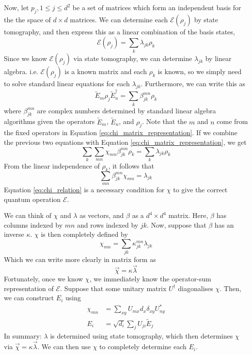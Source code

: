 Now, let $p_j, 1 \le j \le d^2$ be a set of matrices which form an independent basis for the the
space of $d \times d$ matrices. We can determine each $\mathcal{E}(\rho_j)$ by state tomography, and
then express this as a linear combination of the basis states,
\begin{equation}
    \mathcal{E}(\rho_j) = \sum_k \lambda_{jk} \rho_k
\end{equation}
Since we know $\mathcal{E}(\rho_j)$ via state tomography, we can determine $\lambda_{jk}$ by linear
algebra. i.e. $\mathcal{E}(\rho_j)$ is a known matrix and each $\rho_k$ is known, so we simply need
to solve standard linear equations for each $\lambda_{jk}$. Furthermore, we can write this as
\begin{equation}
    \tilde{E}_m \rho_j \tilde{E}_n^{\dagger} = \sum_k \beta_{jk}^{mn} \rho_k
\end{equation}
where $\beta_{jk}^{mn}$ are complex numbers determined by standard linear algebra algorithms given
the operators $\tilde{E}_m$, $\tilde{E}_n$, and $\rho_j$. Note that the $m$ and $n$ come from the
fixed operators in Equation \ref{eq:chi_matrix_representation}. If we combine the previous two
equations with Equation \ref{eq:chi_matrix_representation}, we get
\begin{equation}
    \sum_k \sum_{mn} \chi_{mn} \beta_{jk}^{mn} \rho_k = \sum_k \lambda_{jk} \rho_k
\end{equation}
From the linear independence of $\rho_k$, it follows that
\begin{equation} \label{eq:chi_relation}
    \sum_{mn} \beta_{jk}^{mn} \chi_{mn} = \lambda_{jk}
\end{equation}
Equation \ref{eq:chi_relation} is a necessary condition for $\chi$ to give the correct quantum
operation $\mathcal{E}$.

We can think of $\chi$ and $\lambda$ as vectors, and $\beta$ as a $d^4 \times d^4$ matrix. Here,
$\beta$ has columns indexed by $mn$ and rows indexed by $jk$. Now, suppose that $\beta$ has an
inverse $\kappa$. $\chi$ is then completely defined by
\begin{equation}
    \chi_{mn} = \sum_{jk} \kappa_{jk}^{mn} \lambda_{jk}
\end{equation}
Which we can write more clearly in matrix form as
\begin{equation}
    \vec{\chi} = \kappa \vec{\lambda}
\end{equation}
Fortunately, once we know $\chi$, we immediately know the operator-sum representation of
$\mathcal{E}$. Suppose that some unitary matrix $U^{\dagger}$ diagonalises $\chi$. Then, we can
construct $E_i$ using
\begin{align}
    \chi_{mn} &= \sum_{xy} U_{mx} d_x \delta_{xy} U^*_{ny} \\
    E_i &= \sqrt{d_i} \sum_j U_{ji} \tilde{E}_j
\end{align}
In summary: $\lambda$ is determined using state tomography, which then determines $\chi$ via
$\vec{\chi} = \kappa \vec{\lambda}$. We can then use $\chi$ to completely determine each $E_i$.

